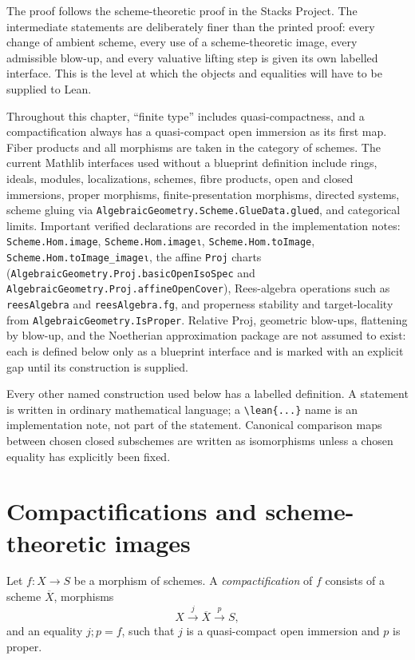The proof follows the scheme-theoretic proof in the Stacks Project.  The
intermediate statements are deliberately finer than the printed proof: every
change of ambient scheme, every use of a scheme-theoretic image, every
admissible blow-up, and every valuative lifting step is given its own labelled
interface.  This is the level at which the objects and equalities will have to
be supplied to Lean.

Throughout this chapter, ``finite type'' includes quasi-compactness, and a
compactification always has a quasi-compact open immersion as its first map.
Fiber products and all morphisms are taken in the category of schemes.
The current Mathlib interfaces used without a blueprint definition include
rings, ideals, modules, localizations, schemes, fibre products, open and closed
immersions, proper morphisms, finite-presentation morphisms, directed systems,
scheme gluing via \texttt{AlgebraicGeometry.Scheme.GlueData.glued}, and
categorical limits.  Important verified declarations are recorded in the
implementation notes: \texttt{Scheme.Hom.image}, \texttt{Scheme.Hom.imageι},
\texttt{Scheme.Hom.toImage}, \texttt{Scheme.Hom.toImage\_imageι}, the affine
\texttt{Proj} charts (\texttt{AlgebraicGeometry.Proj.basicOpenIsoSpec} and
\texttt{AlgebraicGeometry.Proj.affineOpenCover}), Rees-algebra operations such
as \texttt{reesAlgebra} and \texttt{reesAlgebra.fg}, and properness stability
and target-locality from \texttt{AlgebraicGeometry.IsProper}.  Relative Proj,
geometric blow-ups,
flattening by blow-up, and the Noetherian approximation package are not
assumed to exist: each is defined below only as a blueprint interface and is
marked with an explicit gap until its construction is supplied.

Every other named construction used below has a labelled definition.  A
statement is written in ordinary mathematical language; a \verb|\lean{...}| name is
an implementation note, not part of the statement.  Canonical comparison maps
between chosen closed subschemes are written as isomorphisms unless a chosen
equality has explicitly been fixed.

\section{Compactifications and scheme-theoretic images}


\begin{definition}[Compactification] 
  \label{def:nagata-compactification}
  \leanok

  Let $f\colon X\to S$ be a morphism of schemes.  A \emph{compactification}
  of $f$ consists of a scheme $\overline X$, morphisms
  \[
    X\xrightarrow{j}\overline X\xrightarrow{p}S,
  \]
  and an equality $j;p=f$, such that $j$ is a quasi-compact open immersion and
  $p$ is proper.
\end{definition}

